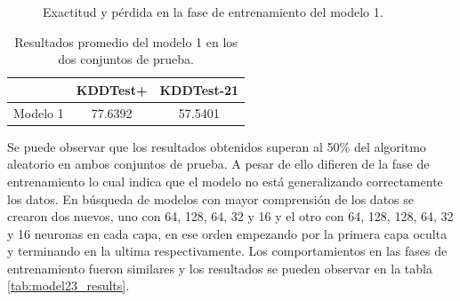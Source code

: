 \begin{figure}[h]
    \centering

    \caption{Exactitud y pérdida en la fase de entrenamiento del modelo 1.}
    \label{fig:4x5_train}
\end{figure}

\begin{table}[h]
    \begin{center}
        \caption{Resultados promedio del modelo 1 en los dos conjuntos de prueba.}

        \label{tab:model1_results}
        \begin{tabular}{c|c|c} %
        \textbf{} & \textbf{KDDTest+} & \textbf{KDDTest-21}\\
        \hline
        Modelo 1 & 77.6392 & 57.5401\\
        \end{tabular}
    \end{center}
\end{table}

Se puede observar que los resultados obtenidos superan al 50\% del algoritmo aleatorio en ambos conjuntos de prueba. A pesar de ello difieren de la fase de entrenamiento lo cual indica que el modelo no está generalizando correctamente los datos. En búsqueda de modelos con mayor comprensión de los datos se crearon dos nuevos, uno con 64, 128, 64, 32 y 16 y el otro con 64, 128, 128, 64, 32 y 16 neuronas en cada capa, en ese orden empezando por la primera capa oculta y terminando en la ultima respectivamente. Los comportamientos en las fases de entrenamiento fueron similares y los resultados se pueden observar en la tabla \ref{tab:model23_results}.

